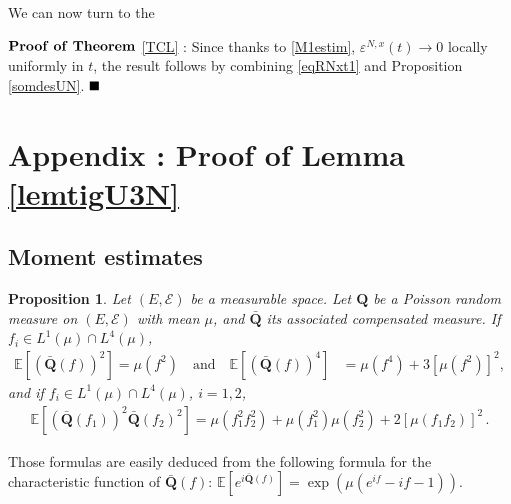 \documentclass[11pt]{article}
\def\E{{\mathbb E}}
\newtheorem{proposition}[theorem]{Proposition}
\begin{document}
We can now turn to the

$\bf{Proof \ of \  Theorem}$  \ref{TCL} : Since thanks to \eqref{M1estim}, $\varepsilon^{N,x}(t)\to0$ locally uniformly in $t$, the result follows by combining \eqref{eqRNxt1} and Proposition \ref{somdesUN}.
$\hfill \blacksquare$ 

 
 \section{Appendix : Proof of Lemma \ref{lemtigU3N}}
 \subsection{Moment estimates}
\begin{proposition}\label{MomComp}
Let $(E, \mathcal{E})$ be a measurable space. Let $\mathbf{Q}$ be a Poisson random measure on $(E, \mathcal{E})$ with mean $\mu$, and $\bar{\mathbf{Q}}$ its associated 
compensated measure. If $f_i\in L^1(\mu) \cap L^4(\mu)$, 
\begin{align*}
\E[(\bar{\mathbf{Q}}(f))^2]=\mu(f^2) \quad \mbox{and} \quad \E[(\bar{\mathbf{Q}}(f))^4]&=\mu(f^4) + 3[\mu(f^2)]^2, 
\end{align*}
and if $f_i\in L^1(\mu) \cap L^4(\mu)$, $i=1,2$, 
 \begin{align*}
\E \left[(\bar{\mathbf{Q}}(f_1))^2\bar{\mathbf{Q}}(f_2)^2 \right]=\mu(f_1^2f_2^2)+\mu(f_1^2)\mu(f_2^2)+2[\mu(f_1f_2)]^2\,.
\end{align*}
\end{proposition}
Those formulas are easily deduced from the following formula for the characteristic function of $\bar{\mathbf{Q}}(f)$:
$\E[e^{i\bar{\mathbf{Q}}(f)}]=\exp(\mu(e^{if}-if-1))$.
\end{document}
